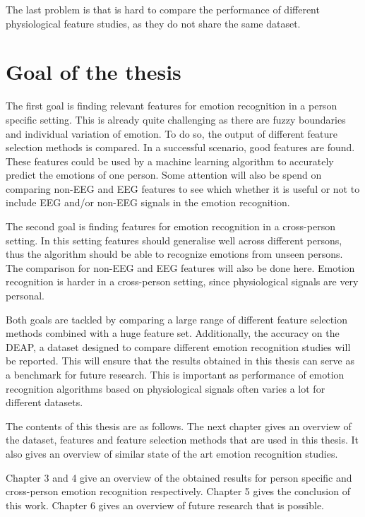 \npar

The last problem is that is hard to compare the performance of different physiological feature studies, as they do not share the same dataset.

\section{Goal of the thesis}
The first goal is finding relevant features for emotion recognition in a person specific setting. This is already quite challenging as there are fuzzy boundaries and individual variation of emotion\citep{emorecoghard}. To do so, the output of different feature selection methods is compared. In a successful scenario, good features are found. These features could be used by a machine learning algorithm to accurately predict the emotions of one person. Some attention will also be spend on comparing non-EEG and EEG features to see which whether it is useful or not to include EEG and/or non-EEG signals in the emotion recognition.

\clearpage

The second goal is finding features for emotion recognition in a cross-person setting. In this setting features should generalise well across different persons, thus the algorithm should be able to recognize emotions from unseen persons. The comparison for non-EEG and EEG features will also be done here. Emotion recognition is harder in a cross-person setting, since physiological signals are very personal\citep{DEAP}.

\npar 

Both goals are tackled by comparing a large range of different feature selection methods combined with a huge feature set. Additionally, the accuracy on the DEAP, a dataset designed to compare different emotion recognition studies\citep{DEAP} will be reported. This will ensure that the results obtained in this thesis can serve as a benchmark for future research. This is important as performance of emotion recognition algorithms based on physiological signals often varies a lot for different datasets\citep{PhytoEm}.

\npar 

The contents of this thesis are as follows. The next chapter gives an overview of the dataset, features and feature selection methods that are used in this thesis. It also gives an overview of similar state of the art emotion recognition studies.
 
\npar
Chapter 3 and 4 give an overview of the obtained results for person specific and cross-person emotion recognition respectively. Chapter 5 gives the conclusion of this work. Chapter 6 gives an overview of future research that is possible.